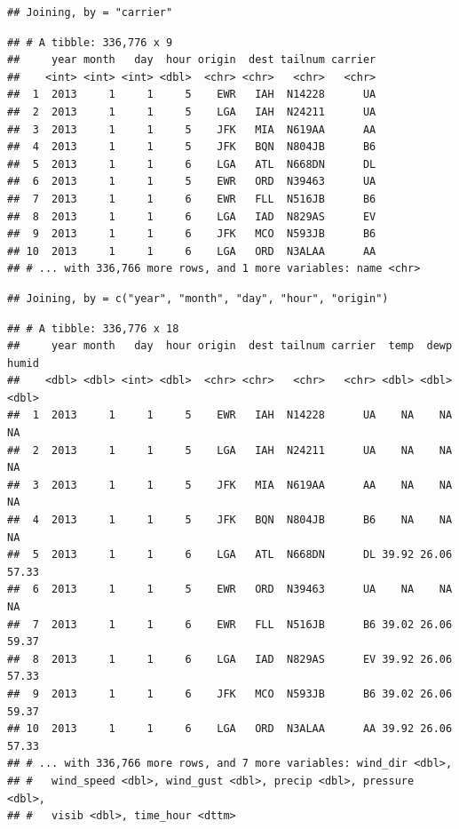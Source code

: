 \documentclass[]{book}
\newenvironment{Shaded}{\begin{snugshade}}{\end{snugshade}}
\newcommand{\KeywordTok}[1]{\textcolor[rgb]{0.13,0.29,0.53}{\textbf{#1}}}
\newcommand{\StringTok}[1]{\textcolor[rgb]{0.31,0.60,0.02}{#1}}
\newcommand{\OperatorTok}[1]{\textcolor[rgb]{0.81,0.36,0.00}{\textbf{#1}}}
\newcommand{\NormalTok}[1]{#1}
\theoremstyle{definition}
\theoremstyle{definition}
\theoremstyle{definition}
\theoremstyle{remark}
\begin{document}
\begin{verbatim}
## Joining, by = "carrier"
\end{verbatim}

\begin{verbatim}
## # A tibble: 336,776 x 9
##     year month   day  hour origin  dest tailnum carrier
##    <int> <int> <int> <dbl>  <chr> <chr>   <chr>   <chr>
##  1  2013     1     1     5    EWR   IAH  N14228      UA
##  2  2013     1     1     5    LGA   IAH  N24211      UA
##  3  2013     1     1     5    JFK   MIA  N619AA      AA
##  4  2013     1     1     5    JFK   BQN  N804JB      B6
##  5  2013     1     1     6    LGA   ATL  N668DN      DL
##  6  2013     1     1     5    EWR   ORD  N39463      UA
##  7  2013     1     1     6    EWR   FLL  N516JB      B6
##  8  2013     1     1     6    LGA   IAD  N829AS      EV
##  9  2013     1     1     6    JFK   MCO  N593JB      B6
## 10  2013     1     1     6    LGA   ORD  N3ALAA      AA
## # ... with 336,766 more rows, and 1 more variables: name <chr>
\end{verbatim}

\begin{Shaded}
\end{Shaded}

\begin{verbatim}
## Joining, by = c("year", "month", "day", "hour", "origin")
\end{verbatim}

\begin{verbatim}
## # A tibble: 336,776 x 18
##     year month   day  hour origin  dest tailnum carrier  temp  dewp humid
##    <dbl> <dbl> <int> <dbl>  <chr> <chr>   <chr>   <chr> <dbl> <dbl> <dbl>
##  1  2013     1     1     5    EWR   IAH  N14228      UA    NA    NA    NA
##  2  2013     1     1     5    LGA   IAH  N24211      UA    NA    NA    NA
##  3  2013     1     1     5    JFK   MIA  N619AA      AA    NA    NA    NA
##  4  2013     1     1     5    JFK   BQN  N804JB      B6    NA    NA    NA
##  5  2013     1     1     6    LGA   ATL  N668DN      DL 39.92 26.06 57.33
##  6  2013     1     1     5    EWR   ORD  N39463      UA    NA    NA    NA
##  7  2013     1     1     6    EWR   FLL  N516JB      B6 39.02 26.06 59.37
##  8  2013     1     1     6    LGA   IAD  N829AS      EV 39.92 26.06 57.33
##  9  2013     1     1     6    JFK   MCO  N593JB      B6 39.02 26.06 59.37
## 10  2013     1     1     6    LGA   ORD  N3ALAA      AA 39.92 26.06 57.33
## # ... with 336,766 more rows, and 7 more variables: wind_dir <dbl>,
## #   wind_speed <dbl>, wind_gust <dbl>, precip <dbl>, pressure <dbl>,
## #   visib <dbl>, time_hour <dttm>
\end{verbatim}
\end{document}
